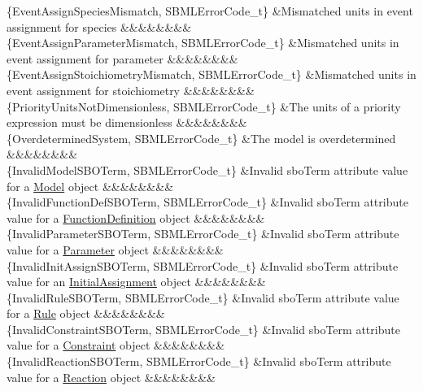 \begin{DoxyParagraph}{}
\begin{longtabu}
\{Event\+Assign\+Species\+Mismatch, S\+B\+M\+L\+Error\+Code\+\_\+t\} &Mismatched units in event assignment for species &&&&&&&&\\
\{Event\+Assign\+Parameter\+Mismatch, S\+B\+M\+L\+Error\+Code\+\_\+t\} &Mismatched units in event assignment for parameter &&&&&&&&\\
\{Event\+Assign\+Stoichiometry\+Mismatch, S\+B\+M\+L\+Error\+Code\+\_\+t\} &Mismatched units in event assignment for stoichiometry &&&&&&&&\\
\{Priority\+Units\+Not\+Dimensionless, S\+B\+M\+L\+Error\+Code\+\_\+t\} &The units of a priority expression must be \textquotesingle{}dimensionless\textquotesingle{} &&&&&&&&\\
\{Overdetermined\+System, S\+B\+M\+L\+Error\+Code\+\_\+t\} &The model is overdetermined &&&&&&&&\\
\{Invalid\+Model\+S\+B\+O\+Term, S\+B\+M\+L\+Error\+Code\+\_\+t\} &Invalid \textquotesingle{}sbo\+Term\textquotesingle{} attribute value for a \hyperlink{class_model}{Model} object &&&&&&&&\\
\{Invalid\+Function\+Def\+S\+B\+O\+Term, S\+B\+M\+L\+Error\+Code\+\_\+t\} &Invalid \textquotesingle{}sbo\+Term\textquotesingle{} attribute value for a \hyperlink{class_function_definition}{Function\+Definition} object &&&&&&&&\\
\{Invalid\+Parameter\+S\+B\+O\+Term, S\+B\+M\+L\+Error\+Code\+\_\+t\} &Invalid \textquotesingle{}sbo\+Term\textquotesingle{} attribute value for a \hyperlink{class_parameter}{Parameter} object &&&&&&&&\\
\{Invalid\+Init\+Assign\+S\+B\+O\+Term, S\+B\+M\+L\+Error\+Code\+\_\+t\} &Invalid \textquotesingle{}sbo\+Term\textquotesingle{} attribute value for an \hyperlink{class_initial_assignment}{Initial\+Assignment} object &&&&&&&&\\
\{Invalid\+Rule\+S\+B\+O\+Term, S\+B\+M\+L\+Error\+Code\+\_\+t\} &Invalid \textquotesingle{}sbo\+Term\textquotesingle{} attribute value for a \hyperlink{class_rule}{Rule} object &&&&&&&&\\
\{Invalid\+Constraint\+S\+B\+O\+Term, S\+B\+M\+L\+Error\+Code\+\_\+t\} &Invalid \textquotesingle{}sbo\+Term\textquotesingle{} attribute value for a \hyperlink{class_constraint}{Constraint} object &&&&&&&&\\
\{Invalid\+Reaction\+S\+B\+O\+Term, S\+B\+M\+L\+Error\+Code\+\_\+t\} &Invalid \textquotesingle{}sbo\+Term\textquotesingle{} attribute value for a \hyperlink{class_reaction}{Reaction} object &&&&&&&&\\

\end{longtabu}
\end{DoxyParagraph}

